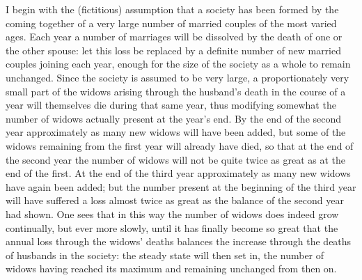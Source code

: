 \noindent\hspace*{\parindent}I begin with the (fictitious) assumption that a society has been formed by the coming together of a very large number of married couples of the most varied ages. Each year a number of marriages will be dissolved by the death of one or the other spouse: let this loss be replaced by a definite number of new married couples joining each year, enough for the size of the society as a whole to remain unchanged. Since the society is assumed to be very large, a proportionately very small part of the widows arising through the husband's death in the course of a year will themselves die during that same year, thus modifying somewhat the number of widows actually present at the year's end. By the end of the second year approximately as many new widows will have been added, but some of the widows remaining from the first year will already have died, so that at the end of the second year the number of widows will not be quite twice as great as at the end of the first. At the end of the third year approximately as many new widows have again been added; but the number present at the beginning of the third year will have suffered a loss almost twice as great as the balance of the second year had shown. One sees that in this way the number of widows does indeed grow continually, but ever more slowly, until it has finally become so great that the annual loss through the widows' deaths balances the increase through the deaths of husbands in the society: the steady state will then set in, the number of widows having reached its maximum and remaining unchanged from then on.

